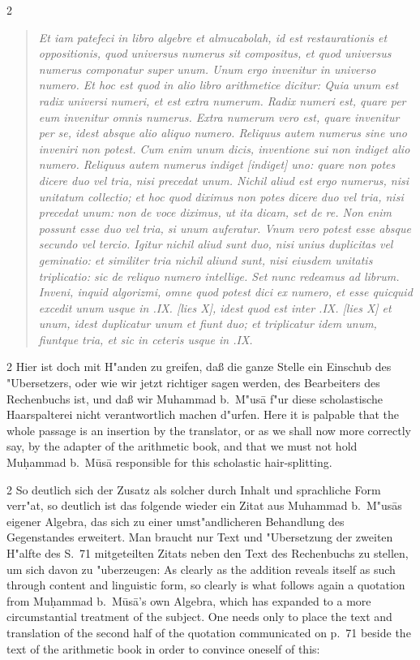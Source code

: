 \documentclass[10pt,a4paper]{article}
\renewcommand{\switchcolumn}{\syncronize\nointerlineskip\columnbreak}
\begin{document}
\begin{paracol}{2}
\begin{quote}
\textit{Et iam patefeci in libro algebre et almucabolah, id est restaurationis et oppositionis, quod universus numerus sit compositus, et quod universus numerus componatur super unum. Unum ergo invenitur in universo numero. Et hoc est quod in alio libro arithmetice dicitur: Quia unum est radix universi numeri, et est extra numerum. Radix numeri est, quare per eum invenitur omnis numerus. Extra numerum vero est, quare invenitur per se, idest absque alio aliquo numero. Reliquus autem numerus sine uno inveniri non potest. Cum enim unum dicis, inventione sui non indiget alio numero. Reliquus autem numerus indiget [indiget] uno: quare non potes dicere duo vel tria, nisi precedat unum. Nichil aliud est ergo numerus, nisi unitatum collectio; et hoc quod diximus non potes dicere duo vel tria, nisi precedat unum: non de voce diximus, ut ita dicam, set de re. Non enim possunt esse duo vel tria, si unum auferatur. Vnum vero potest esse absque secundo vel tercio. Igitur nichil aliud sunt duo, nisi unius duplicitas vel geminatio: et similiter tria nichil aliund sunt, nisi eiusdem unitatis triplicatio: sic de reliquo numero intellige. Set nunc redeamus ad librum. Inveni, inquid algorizmi, omne quod potest dici ex numero, et esse quicquid excedit unum usque in .IX. [lies X], idest quod est inter .IX. [lies X] et unum, idest duplicatur unum et fiunt duo; et triplicatur idem unum, fiuntque tria, et sic in ceteris usque in .IX.}
\end{quote}
\end{paracol}

\begin{paracol}{2}
Hier ist doch mit H"anden zu greifen, da\ss{} die ganze Stelle ein Einschub des "Ubersetzers, oder wie wir jetzt richtiger sagen werden, des Bearbeiters des Rechenbuchs ist, und da\ss{} wir Muhammad b.\ M"us\=a f"ur diese scholastische Haarspalterei nicht verantwortlich machen d"urfen.
\switchcolumn
Here it is palpable that the whole passage is an insertion by the translator, or as we shall now more correctly say, by the adapter of the arithmetic book, and that we must not hold Mu\d{h}ammad b.\ M\=us\=a responsible for this scholastic hair-splitting.
\end{paracol}

\begin{paracol}{2}
So deutlich sich der Zusatz als solcher durch Inhalt und sprachliche Form verr"at, so deutlich ist das folgende wieder ein Zitat aus Muhammad b.\ M"us\=as eigener Algebra, das sich zu einer umst"andlicheren Behandlung des Gegenstandes erweitert. Man braucht nur Text und "Ubersetzung der zweiten H"alfte des S.\ 71 mitgeteilten Zitats neben den Text des Rechenbuchs zu stellen, um sich davon zu "uberzeugen:
\switchcolumn
As clearly as the addition reveals itself as such through content and linguistic form, so clearly is what follows again a quotation from Mu\d{h}ammad b.\ M\=us\=a's own Algebra, which has expanded to a more circumstantial treatment of the subject. One needs only to place the text and translation of the second half of the quotation communicated on p.\ 71 beside the text of the arithmetic book in order to convince oneself of this:
\end{paracol}
\end{document}
